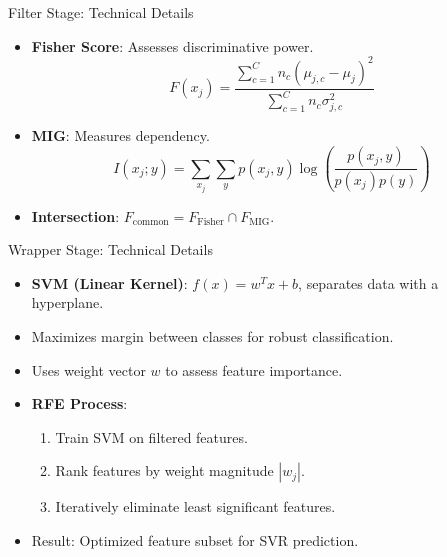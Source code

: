 \documentclass{beamer}
\begin{document}
\begin{frame}{Filter Stage: Technical Details}
    \begin{itemize}
        \item \textbf{Fisher Score}: Assesses discriminative power. \hfill
        \[
        F(x_j) = \frac{\sum_{c=1}^C n_c (\mu_{j,c} - \mu_j)^2}{\sum_{c=1}^C n_c \sigma_{j,c}^2}
        \]
        \vspace{0.5cm}
        \item \textbf{MIG}: Measures dependency. \hfill
        \[
        I(x_j; y) = \sum_{x_j} \sum_y p(x_j, y) \log \left( \frac{p(x_j, y)}{p(x_j) p(y)} \right)
        \]
        \vspace{0.5cm}
        \item \textbf{Intersection}: \( F_{\text{common}} = F_{\text{Fisher}} \cap F_{\text{MIG}} \).
    \end{itemize}
\end{frame}

\begin{frame}{Wrapper Stage: Technical Details}
    \begin{itemize}
        \item \textbf{SVM (Linear Kernel)}: \( f(x) = w^T x + b \), separates data with a hyperplane.
        \item Maximizes margin between classes for robust classification.
        \item Uses weight vector \( w \) to assess feature importance.
        \item \textbf{RFE Process}:
            \begin{enumerate}
                \item Train SVM on filtered features.
                \item Rank features by weight magnitude \( |w_j| \).
                \  \item Iteratively eliminate least significant features.
            \end{enumerate}
        \item Result: Optimized feature subset for SVR prediction.
    \end{itemize}
\end{frame}
\end{document}
